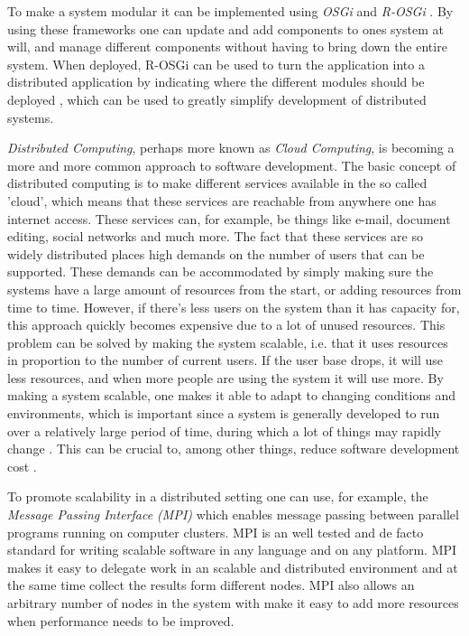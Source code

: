 \documentclass{article}
\begin{document}
{To make a system modular it can be implemented using \emph{OSGi} and
\emph{R-OSGi} \cite{rellermeyer2007services} \cite{marples2001open}. By using these frameworks one can
update and add components to ones system at will, and manage different
components without having to bring down the entire system. When deployed,
R-OSGi can be used to turn the application into a distributed application by
indicating where the different modules should be deployed
\cite{rellermeyer2007r}, which can be used to greatly simplify development of
distributed systems.

\emph{Distributed Computing}, perhaps more known as \emph{Cloud Computing}, is becoming a
more and more common approach to software development. The basic concept of
distributed computing is to make different services available in the so called
'cloud', which means that these services are reachable from anywhere one has
internet access. These services can, for example, be things like e-mail,
document editing, social networks and much more. The fact that these services
are so widely distributed places high demands on the number of users that can
be supported. These demands can be accommodated by simply making sure the
systems have a large amount of resources from the start, or adding resources
from time to time. However, if there's less users on the system than it has
capacity for, this approach quickly becomes expensive due to a lot of unused
resources. This problem can be solved by making the system scalable, i.e. that
it uses resources in proportion to the number of current users. If the user
base drops, it will use less resources, and when more people are using the
system it will use more. By making a system scalable, one makes it able to
adapt to changing conditions and environments, which is important since a
system is generally developed to run over a relatively large period of time,
during which a lot of things may rapidly change \cite{van1998software}
\cite{caruso1997toward}. This can be crucial to, among other things, reduce
software development cost \cite{fayad2005towards}.

To promote scalability in a distributed setting one can use, for example, the
\emph{Message Passing Interface (MPI)} which enables message passing between
parallel programs running on computer clusters. MPI is
an well tested and de facto standard for writing scalable software in any
language and on any platform. MPI makes it easy to delegate work in an
scalable and distributed environment and at the same time collect the results
form different nodes. MPI also allows an arbitrary number of nodes in the 
system with make it easy to add more resources when performance needs to
be improved. \cite{gropp1996high}
 
}
\end{document}
